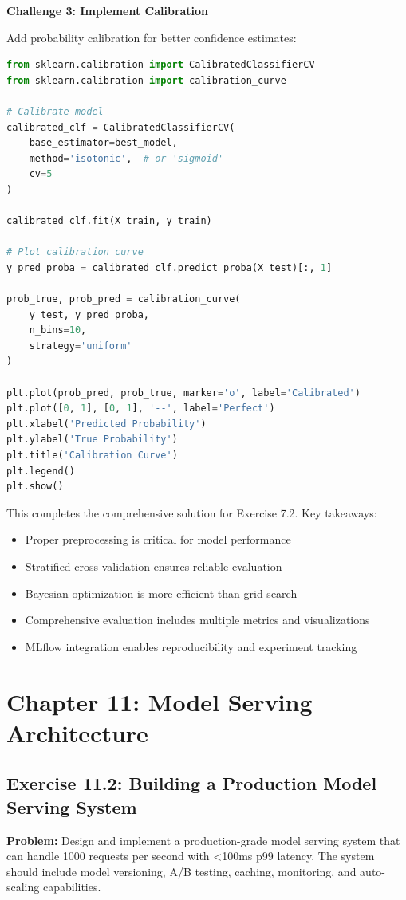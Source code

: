 \textbf{Challenge 3: Implement Calibration}

Add probability calibration for better confidence estimates:

\begin{lstlisting}[language=Python]
from sklearn.calibration import CalibratedClassifierCV
from sklearn.calibration import calibration_curve

# Calibrate model
calibrated_clf = CalibratedClassifierCV(
    base_estimator=best_model,
    method='isotonic',  # or 'sigmoid'
    cv=5
)

calibrated_clf.fit(X_train, y_train)

# Plot calibration curve
y_pred_proba = calibrated_clf.predict_proba(X_test)[:, 1]

prob_true, prob_pred = calibration_curve(
    y_test, y_pred_proba,
    n_bins=10,
    strategy='uniform'
)

plt.plot(prob_pred, prob_true, marker='o', label='Calibrated')
plt.plot([0, 1], [0, 1], '--', label='Perfect')
plt.xlabel('Predicted Probability')
plt.ylabel('True Probability')
plt.title('Calibration Curve')
plt.legend()
plt.show()
\end{lstlisting}

This completes the comprehensive solution for Exercise 7.2. Key takeaways:
\begin{itemize}
    \item Proper preprocessing is critical for model performance
    \item Stratified cross-validation ensures reliable evaluation
    \item Bayesian optimization is more efficient than grid search
    \item Comprehensive evaluation includes multiple metrics and visualizations
    \item MLflow integration enables reproducibility and experiment tracking
\end{itemize}

\section{Chapter 11: Model Serving Architecture}

\subsection{Exercise 11.2: Building a Production Model Serving System}

\textbf{Problem:} Design and implement a production-grade model serving system that can handle 1000 requests per second with <100ms p99 latency. The system should include model versioning, A/B testing, caching, monitoring, and auto-scaling capabilities.

